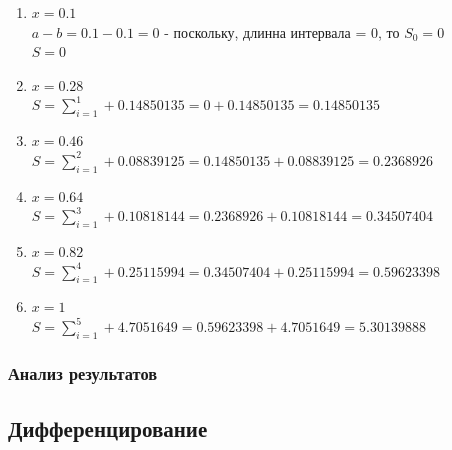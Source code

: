 \documentclass{article}
\begin{document}
\begin{enumerate}[label= \arabic{*}:]
  \item 
  $ x = 0.1$ \\
  $a-b = 0.1 - 0.1 = 0$ - поскольку, длинна интервала = 0, то $S_0 = 0$\\
  $S = 0$

  \item 
  $ x = 0.28$ \\ 
  $S = \sum\limits_{i=1}^1 + 0.14850135 = 0 + 0.14850135 = 0.14850135$ \\
  
  \item 
  $ x = 0.46$ \\
  $S = \sum\limits_{i=1}^2 + 0.08839125 = 0.14850135 + 0.08839125 = 0.2368926$\\
  
  \item 
  $ x = 0.64$ \\
  $S = \sum\limits_{i=1}^3 + 0.10818144 = 0.2368926 + 0.10818144 = 0.34507404$\\
  
  \item 
  $ x = 0.82$ \\
  $S = \sum\limits_{i=1}^4 + 0.25115994 = 0.34507404 + 0.25115994 = 0.59623398$\\
  
  \item 
  $ x = 1$ \\
  $S = \sum\limits_{i=1}^5 + 4.7051649 = 0.59623398 + 4.7051649 = 5.30139888$\\
  
\end{enumerate}

\subsubsection{Анализ результатов}

\subsection{Дифференцирование}
\end{document}
